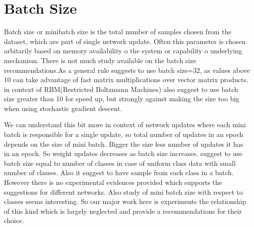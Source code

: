 \section{Batch Size}

Batch size or minibatch size is the total number of samples chosen from the dataset, which are part of single network update. Often this parameter is chosen arbitarily based on memory availability o the system or capability o underlying mechanism.
There is not much study available on the batch size recommendations.As a general rule \cite{DBLP:journals/corr/abs-1206-5533} suggests to use batch size=32, as values above 10 can take advantage of fast matrix multiplications over vector matrix products.
\cite{Hinton2012} in context of RBM(Restricted Boltzmann Machines) also suggest to use batch size greater than 10 for speed up, but strongly against making the size too big when using stochastic gradient descent.

We can understand this bit more in context of network updates where each mini batch is responsible for a single update, so total number of updates in an epoch depends on the size of mini batch. Bigger the size less number of updates it has in an epoch. So weight updates decreases as batch size increases. \cite{Hinton2012} suggest to use batch size equal to number of classes in case of uniform class data with small number of classes. 
Also it suggest to have sample from each class in a batch.
However there is no experimental evidences provided which supports the suggestions for different networks. Also study of mini batch size with respect to classes seems interesting. So our major work here is experiments the relationship of this kind which is largely neglected and provide a recommendations for their choice. 

%

 

